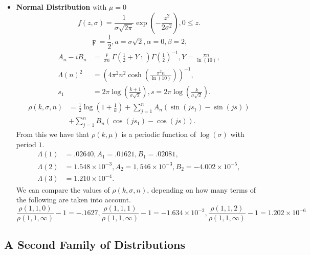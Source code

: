 \documentclass[titlepage,fleqn]{article}%
\begin{document}
\begin{itemize}
\item \textbf{Normal Distribution} with $\mu=0$%
\[
f(z,\sigma)=\frac{1}{\sigma\sqrt{2\pi}}\exp\left(  -\frac{z^{2}}{2\sigma^{2}%
}\right)  ,0\leq z.
\]%
\begin{equation}
\digamma=\frac{1}{2},a=\sigma\sqrt{2},\alpha=0,\beta=2, \label{Nomal0}%
\end{equation}%
\begin{align}
A_{n}-iB_{n}  &  =\frac{\digamma}{\pi n}\Gamma\left(  \frac{1}{2}%
+Y\imath\right)  \Gamma\left(  \frac{1}{2}\right)  ^{-1},Y=\frac{\pi n}%
{\ln(10)},\\
\Lambda(n)^{2}  &  =\left(  4\pi^{2}n^{2}\cosh\left(  \frac{\pi^{2}n}{\ln
(10)}\right)  \right)  ^{-1},\nonumber\\
s_{1}  &  =2\pi\log\left(  \frac{k+1}{\sigma\sqrt{2}}\right)  ,s=2\pi
\log\left(  \frac{k}{\sigma\sqrt{2}}\right)  .\nonumber
\end{align}%
\begin{align*}
\rho(k,\sigma,n)  &  =\frac{1}{2}\log\left(  1+\frac{1}{k}\right)  +%
{\displaystyle\sum\limits_{j=1}^{n}}
A_{n}\left(  \sin\left(  js_{1}\right)  -\sin\left(  js\right)  \right) \\
&  +%
{\displaystyle\sum\limits_{j=1}^{n}}
B_{n}\left(  \cos\left(  js_{1}\right)  -\cos\left(  js\right)  \right)  .
\end{align*}
From this we have that $\rho(k,\mu)$ is a periodic function of $\log\left(
\sigma\right)  $ with period $1.$%
\begin{align*}
\Lambda(1)  &  =.02640,A_{1}=.01621,B_{1}=.02081,\\
\Lambda(2)  &  =1.548\times10^{-3},A_{2}=1,546\times10^{-3},B_{2}%
=-4.002\times10^{-5},\\
\Lambda(3)  &  =1.210\times10^{-4}.
\end{align*}
We can compare the values of $\rho(k,\sigma,n)$, depending on how many terms
of the following are taken into account.%
\[
\frac{\rho(1,1,0)}{\rho(1,1,\infty)}-1=-.1627,\frac{\rho(1,1,1)}%
{\rho(1,1,\infty)}-1=-1.634\times10^{-2},\frac{\rho(1,1,2)}{\rho(1,1,\infty
)}-1=1.202\times10^{-6}%
\]

\end{itemize}

\subsection{A Second Family of Distributions}
\end{document}
